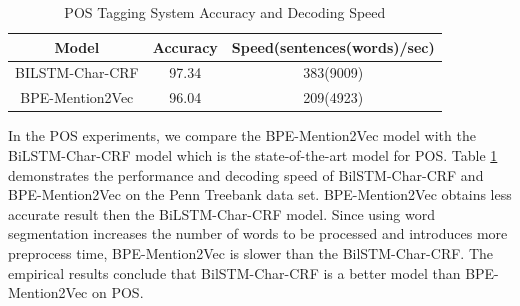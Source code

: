 \begin{table}[]
\centering
\caption{POS Tagging System Accuracy and Decoding Speed}
\label{table:pos-mention2vec}
\begin{tabular}{|c|c|c|}
\hline
Model   & Accuracy     & Speed(sentences(words)/sec) \\ \hline
BILSTM-Char-CRF & 97.34  & 383(9009)                  \\ \hline
BPE-Mention2Vec      & 96.04  & 209(4923)                   \\ \hline
\end{tabular}
\end{table}

In the POS experiments, we compare the BPE-Mention2Vec model with the BiLSTM-Char-CRF model which is the state-of-the-art model for POS. Table \ref{table:pos-mention2vec} demonstrates the performance and decoding speed of BilSTM-Char-CRF and BPE-Mention2Vec on the Penn Treebank data set. BPE-Mention2Vec obtains less accurate result then the BiLSTM-Char-CRF model. Since using word segmentation increases the number of words to be processed and introduces more preprocess time, BPE-Mention2Vec is slower than the BilSTM-Char-CRF. The empirical results conclude that BilSTM-Char-CRF is a better model than BPE-Mention2Vec on POS. 
